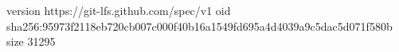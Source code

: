 version https://git-lfs.github.com/spec/v1
oid sha256:95973f2118eb720cb007c000f40b16a1549fd695a4d4039a9c5dac5d071f580b
size 31295
